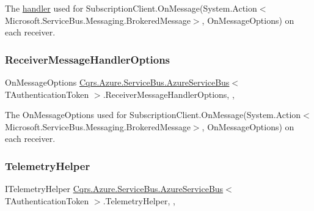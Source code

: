 The \hyperlink{}{handler} used for Subscription\+Client.\+On\+Message(\+System.\+Action$<$\+Microsoft.\+Service\+Bus.\+Messaging.\+Brokered\+Message$>$, On\+Message\+Options) on each receiver. 

\mbox{\label{classCqrs_1_1Azure_1_1ServiceBus_1_1AzureServiceBus_abe75d8be8b9ffbc5a37164467963babd_abe75d8be8b9ffbc5a37164467963babd}} 
\subsubsection{\texorpdfstring{Receiver\+Message\+Handler\+Options}{ReceiverMessageHandlerOptions}}
{\footnotesize\ttfamily On\+Message\+Options \hyperlink{classCqrs_1_1Azure_1_1ServiceBus_1_1AzureServiceBus}{Cqrs.\+Azure.\+Service\+Bus.\+Azure\+Service\+Bus}$<$ T\+Authentication\+Token $>$.Receiver\+Message\+Handler\+Options\hspace{0.3cm}{\ttfamily [get]}, {\ttfamily [set]}, {\ttfamily [protected]}}



The On\+Message\+Options used for Subscription\+Client.\+On\+Message(\+System.\+Action$<$\+Microsoft.\+Service\+Bus.\+Messaging.\+Brokered\+Message$>$, On\+Message\+Options) on each receiver. 

\mbox{\label{classCqrs_1_1Azure_1_1ServiceBus_1_1AzureServiceBus_af5f6d62cbdb3ad711ea42505491ffca3_af5f6d62cbdb3ad711ea42505491ffca3}} 
\subsubsection{\texorpdfstring{Telemetry\+Helper}{TelemetryHelper}}
{\footnotesize\ttfamily I\+Telemetry\+Helper \hyperlink{classCqrs_1_1Azure_1_1ServiceBus_1_1AzureServiceBus}{Cqrs.\+Azure.\+Service\+Bus.\+Azure\+Service\+Bus}$<$ T\+Authentication\+Token $>$.Telemetry\+Helper\hspace{0.3cm}{\ttfamily [get]}, {\ttfamily [set]}, {\ttfamily [protected]}}



